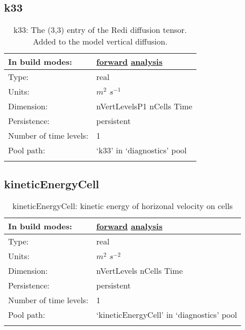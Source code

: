 \subsection[k33]{k33}
\label{subsec:var_sec_diagnostics_k33}
\begin{center}
\begin{longtable}{| p{2.0in} | p{4.0in} |}
        \hline 
        In build modes: & \hyperref[subsec:forward_var_tab_diagnostics]{forward} \hyperref[subsec:analysis_var_tab_diagnostics]{analysis} \\
        \hline 
        Type: & real \\
        \hline 
        Units: & $m^2$ $s^{-1}$ \\
        \hline 
        Dimension: & nVertLevelsP1 nCells Time \\
        \hline 
        Persistence: & persistent \\
        \hline 
        Number of time levels: & 1 \\
        \hline 
            Pool path: & `k33' in `diagnostics' pool \\
		 \hline 
    \caption{k33: The (3,3) entry of the Redi diffusion tensor. Added to the model vertical diffusion.}
\end{longtable}
\end{center}
\subsection[kineticEnergyCell]{kineticEnergyCell}
\label{subsec:var_sec_diagnostics_kineticEnergyCell}
\begin{center}
\begin{longtable}{| p{2.0in} | p{4.0in} |}
        \hline 
        In build modes: & \hyperref[subsec:forward_var_tab_diagnostics]{forward} \hyperref[subsec:analysis_var_tab_diagnostics]{analysis} \\
        \hline 
        Type: & real \\
        \hline 
        Units: & $m^2$ $s^{-2}$ \\
        \hline 
        Dimension: & nVertLevels nCells Time \\
        \hline 
        Persistence: & persistent \\
        \hline 
        Number of time levels: & 1 \\
        \hline 
            Pool path: & `kineticEnergyCell' in `diagnostics' pool \\
		 \hline 
    \caption{kineticEnergyCell: kinetic energy of horizonal velocity on cells}
\end{longtable}
\end{center}
